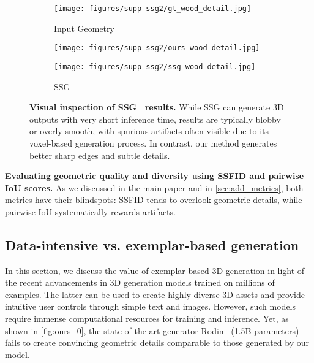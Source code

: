 \begin{figure}[!h]
\begin{subfigure}{.32\linewidth}
        \centering
        \texttt{[image: figures/supp-ssg2/gt\_wood\_detail.jpg]}
        \caption{Input Geometry}
    \end{subfigure}
 \begin{subfigure}{.32\linewidth}
        \centering
        \texttt{[image: figures/supp-ssg2/ours\_wood\_detail.jpg]}
        \caption{\ourmethod{}}
    \end{subfigure}
    \begin{subfigure}{.32\linewidth}
        \centering
        \texttt{[image: figures/supp-ssg2/ssg\_wood\_detail.jpg]}
        \caption{SSG}
    \end{subfigure}

    \caption{\textbf{Visual inspection of SSG~\cite{wu2022learning} results.} While SSG can generate 3D outputs with very short inference time, results are typically blobby or overly smooth, with spurious artifacts often visible due to its voxel-based generation process. In contrast, our method generates better sharp edges and subtle details.}
    \label{fig:ssg} 
\end{figure}


\begin{table}[!h]
    \centering
    \resizebox{1.\linewidth}{!}{}
    \vspace*{-1mm}
    \caption{\textbf{Evaluating geometric quality and diversity using SSFID and pairwise IoU scores.} As we discussed in the main paper and in \cref{sec:add_metrics}, both metrics have their blindspots: SSFID tends to overlook geometric details, while pairwise IoU systematically rewards artifacts.} 
    \label{tab:ssfid2}
\end{table}

\subsection{Data-intensive vs. exemplar-based generation}

In this section, we discuss the value of exemplar-based 3D generation in light of the recent advancements in 3D generation models trained on millions of examples. The latter can be used to create highly diverse 3D assets and provide intuitive user controls through simple text and images. However, such models require immense computational resources for training and inference. Yet, as shown in \cref{fig:ours_0}, 
the state-of-the-art generator Rodin~\cite{zhang2024clay} (1.5B parameters) fails to create convincing geometric details comparable to those generated by our model.

